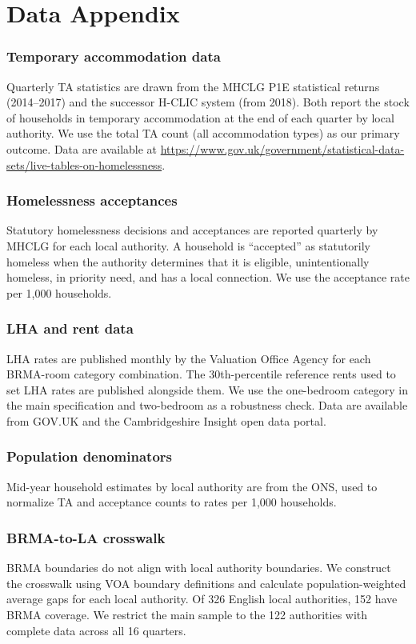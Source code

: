 \documentclass[12pt]{article}
\begin{document}
\section{Data Appendix}
\label{sec:data_appendix}

\subsubsection*{Temporary accommodation data} Quarterly TA statistics are drawn from the MHCLG P1E statistical returns (2014--2017) and the successor H-CLIC system (from 2018). Both report the stock of households in temporary accommodation at the end of each quarter by local authority. We use the total TA count (all accommodation types) as our primary outcome. Data are available at \url{https://www.gov.uk/government/statistical-data-sets/live-tables-on-homelessness}.

\subsubsection*{Homelessness acceptances} Statutory homelessness decisions and acceptances are reported quarterly by MHCLG for each local authority. A household is ``accepted'' as statutorily homeless when the authority determines that it is eligible, unintentionally homeless, in priority need, and has a local connection. We use the acceptance rate per 1,000 households.

\subsubsection*{LHA and rent data} LHA rates are published monthly by the Valuation Office Agency for each BRMA-room category combination. The 30th-percentile reference rents used to set LHA rates are published alongside them. We use the one-bedroom category in the main specification and two-bedroom as a robustness check. Data are available from GOV.UK and the Cambridgeshire Insight open data portal.

\subsubsection*{Population denominators} Mid-year household estimates by local authority are from the ONS, used to normalize TA and acceptance counts to rates per 1,000 households.

\subsubsection*{BRMA-to-LA crosswalk} BRMA boundaries do not align with local authority boundaries. We construct the crosswalk using VOA boundary definitions and calculate population-weighted average gaps for each local authority. Of 326 English local authorities, 152 have BRMA coverage. We restrict the main sample to the 122 authorities with complete data across all 16 quarters.
\end{document}
